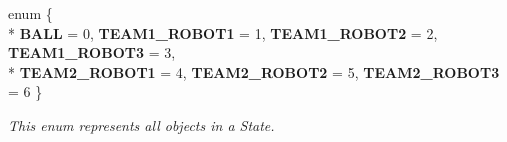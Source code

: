 \begin{DoxyCompactItemize}
\item 
enum \{ \\*
{\bfseries B\+A\+LL} = 0, 
{\bfseries T\+E\+A\+M1\+\_\+\+R\+O\+B\+O\+T1} = 1, 
{\bfseries T\+E\+A\+M1\+\_\+\+R\+O\+B\+O\+T2} = 2, 
{\bfseries T\+E\+A\+M1\+\_\+\+R\+O\+B\+O\+T3} = 3, 
\\*
{\bfseries T\+E\+A\+M2\+\_\+\+R\+O\+B\+O\+T1} = 4, 
{\bfseries T\+E\+A\+M2\+\_\+\+R\+O\+B\+O\+T2} = 5, 
{\bfseries T\+E\+A\+M2\+\_\+\+R\+O\+B\+O\+T3} = 6
 \}\hypertarget{namespacecommon_a621a02b7b7574c1037f6e656ad8646e5}{}\label{namespacecommon_a621a02b7b7574c1037f6e656ad8646e5}
\begin{DoxyCompactList}\small\item\em This enum represents all objects in a State. \end{DoxyCompactList}
\end{DoxyCompactItemize}
